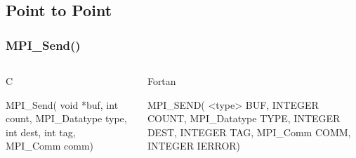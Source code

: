 \documentclass{beamer}
\begin{document}
\subsection{Point to Point}
\begin{frame}[fragile]
 \frametitle{MPI\_Send()}
   \begin{columns}[T]
    \begin{column}{5cm}
     \begin{block}{C}
      \begin{semiverbatim}
MPI\_Send( void  *buf,
           int count,
  MPI\_Datatype  type,
           int  dest,
           int   tag,
      MPI\_Comm   comm)
      \end{semiverbatim}
     \end{block}
    \end{column}
    \begin{column}{5cm}
     \begin{block}{Fortan}
      \begin{semiverbatim}
MPI\_SEND( <type>   BUF,
      INTEGER    COUNT,
 MPI\_Datatype     TYPE,
      INTEGER     DEST,
      INTEGER      TAG,
     MPI\_Comm     COMM,
      INTEGER    IERROR)
      \end{semiverbatim}
     \end{block}
    \end{column}
   \end{columns}
\end{frame}
\end{document}
